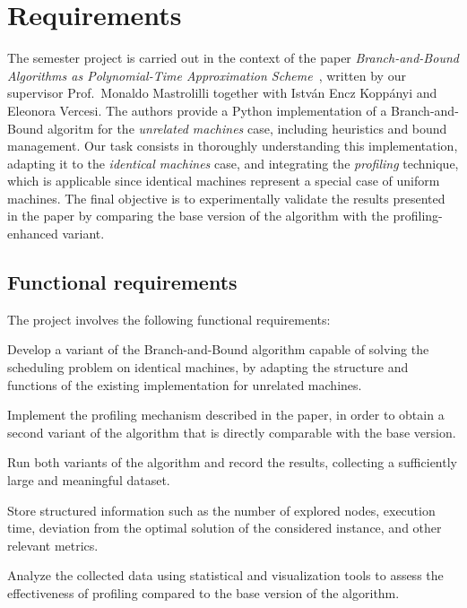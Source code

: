 \chapter{Requirements}
\label{ch:requirements}

The semester project is carried out in the context of the paper \emph{Branch-and-Bound Algorithms as Polynomial-Time Approximation Scheme}~\cite{bb-ptas}, written by our supervisor Prof.\ Monaldo Mastrolilli together with István Encz Koppányi and Eleonora Vercesi.
The authors provide a Python implementation of a Branch-and-Bound algoritm for the \emph{unrelated machines} case, including heuristics and bound management.
Our task consists in thoroughly understanding this implementation, adapting it to the \emph{identical machines} case, and integrating the \emph{profiling} technique, which is applicable since identical machines represent a special case of uniform machines.
The final objective is to experimentally validate the results presented in the paper by comparing the base version of the algorithm with the profiling-enhanced variant.

\section{Functional requirements}

The project involves the following functional requirements:

\begin{description}[style=nextline]
    \item[R1 -- Solver for identical machines] Develop a variant of the Branch-and-Bound algorithm capable of solving the scheduling problem on identical machines, by adapting the structure and functions of the existing implementation for unrelated machines.
    \item[R2 -- Profiling integration] Implement the profiling mechanism described in the paper, in order to obtain a second variant of the algorithm that is directly comparable with the base version.
    \item[R3 -- Experiment generation and execution] Run both variants of the algorithm and record the results, collecting a sufficiently large and meaningful dataset.
    \item[R4 -- Data collection] Store structured information such as the number of explored nodes, execution time, deviation from the optimal solution of the considered instance, and other relevant metrics.
    \item[R5 -- Experimental validation] Analyze the collected data using statistical and visualization tools to assess the effectiveness of profiling compared to the base version of the algorithm.
\end{description}


